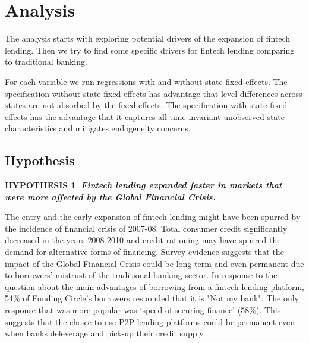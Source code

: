 \documentclass[11pt, a4paper, leqno]{article}
\newtheorem{hypothesis}{HYPOTHESIS}
\begin{document}
\section{Analysis}
The analysis starts with exploring potential drivers of the expansion of fintech lending. Then we try to find some specific drivers for fintech lending comparing to traditional banking.

For each variable we run regressions with and without state fixed effects. The specification without state fixed effects has advantage that level differences across states are not absorbed by the fixed effects. The specification with state fixed effects has the advantage that it captures all time-invariant unobserved state characteristics and mitigates endogeneity concerns.

\subsection{Hypothesis}
\begin{hypothesis}
\textbf{Fintech lending expanded faster in markets that were more affected by the Global Financial Crisis.}
\end{hypothesis}

The entry and the early expansion of fintech lending might have been spurred by the incidence of financial crisis of 2007-08. Total consumer credit significantly decreased in the years 2008-2010 and credit rationing may have spurred the demand for alternative forms of financing. Survey evidence suggests that the impact of the Global Financial Crisis could be long-term and even permanent due to borrowers' mistrust of the traditional banking sector. In response to the question about the main advantages of borrowing from a fintech lending platform, 54\% of Funding Circle's borrowers responded that it is "Not my bank". The only response that was more popular was ‘speed of securing finance’ (58\%). This suggests that the choice to use P2P lending platforms could be permanent even when banks deleverage and pick-up their credit supply.
\end{document}
